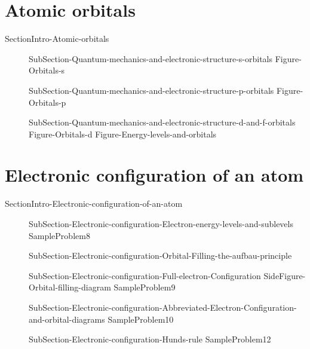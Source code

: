 \documentclass[main.tex]{subfiles}
\newcommand\chapterlabel{Ch-Table}\setcounter{figurenewcounter}{0}\setcounter{tablenewcounter}{0}\setcounter{formulanewcounter}{0}\chapterpicture{../{\chapterlabel}/figure1}\chapterpicturelabel{PxFuel}
\begin{document}
{ 

 

\section{Atomic orbitals}{SectionIntro-Atomic-orbitals} 
\sloppy\begin{description}
\item[] {SubSection-Quantum-mechanics-and-electronic-structure-s-orbitals} 
 {Figure-Orbitals-s}
\item[] {SubSection-Quantum-mechanics-and-electronic-structure-p-orbitals}
 {Figure-Orbitals-p}
\item[] {SubSection-Quantum-mechanics-and-electronic-structure-d-and-f-orbitals}
{Figure-Orbitals-d}
 {Figure-Energy-levels-and-orbitals}
\end{description}



\section{Electronic configuration of an atom}{SectionIntro-Electronic-configuration-of-an-atom}
\sloppy\begin{description}
\item[] {SubSection-Electronic-configuration-Electron-energy-levels-and-sublevels}
{SampleProblem8}
     \label{Fig:{\chapterlabel}\thefigurenewcounter} 
\item[]{SubSection-Electronic-configuration-Orbital-Filling-the-aufbau-principle}
\item[] {SubSection-Electronic-configuration-Full-electron-Configuration}
{SideFigure-Orbital-filling-diagram}
{SampleProblem9}
\item[] {SubSection-Electronic-configuration-Abbreviated-Electron-Configuration-and-orbital-diagrams}
{SampleProblem10}
\item[] {SubSection-Electronic-configuration-Hunds-rule}
{SampleProblem12}
\end{description}


}
\end{document}
